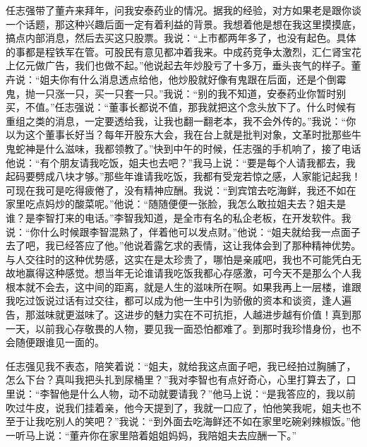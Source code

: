 \documentclass[12pt,oneside]{book}
\begin{document}
任志强带了董卉来拜年，问我安泰药业的情况。据我的经验，对方如果老是跟你谈一个话题，那这种兴趣后面一定有着利益的背景。我想着他是想在我这里摸摸底，搞点内部消息，然后去买这只股票。我说：``上市都两年多了，也没有起色。具体的事都是程铁军在管。可股民有意见都冲着我来。中成药竞争太激烈，汇仁肾宝花上亿元做广告，我们也做不起。''他说起去年炒股亏了十多万，垂头丧气的样子。董卉说：``姐夫你有什么消息透点给他，他炒股就好像有鬼跟在后面，还是个倒霉鬼，抛一只涨一只，买一只套一只。''我说：``别的我不知道，安泰药业你暂时别买，不值。''任志强说：``董事长都说不值，那我就把这个念头放下了。什么时候有重组之类的消息，一定要透给我，让我也翻一翻老本，我不会外传的。''我说：``你以为这个董事长好当？每年开股东大会，我在台上就是批判对象，文革时批那些牛鬼蛇神是什么滋味，我都领教了。''快到中午的时候，任志强的手机响了，接了电话他说：``有个朋友请我吃饭，姐夫也去吧？''我马上说：``要是每个人请我都去，我起码要劈成八块才够。''那些年谁请我吃饭，我都有受宠若惊之感，人家能记起我！可现在我可是吃得疲倦了，没有精神应酬。我说：``到宾馆去吃海鲜，我还不如在家里吃点妈炒的酸菜呢。''他说：``随随便便一张脸，我怎么敢拉姐夫去？姐夫是谁？是李智打来的电话。''李智我知道，是全市有名的私企老板，在开发软件。我说：``你什么时候跟李智混熟了，伴着他可以发点财。''他说：``姐夫就给我一点面子去了吧，我已经答应了他。''他说着露乞求的表情，这让我体会到了那种精神优势。与人交往时的这种优势感，这实在是太珍贵了，哪怕是亲戚吧，我也不可能凭白无故地赢得这种感觉。想当年无论谁请我吃饭我都心存感激，可今天不是那么个人我根本就不会去，这中间的距离，就是人生的滋味所在啊。如果我再上一层楼，谁跟我吃过饭说过话有过交往，都可以成为他一生中引为骄傲的资本和谈资，逢人遍告，那滋味就更滋味了。这进步的魅力实在不可抗拒，人越进步越有价值！真到那一天，以前我心存敬畏的人物，要见我一面恐怕都难了。到那时我珍惜身份，也不会随便跟谁见一面的。

任志强见我不表态，陪笑着说：``姐夫，就给我这点面子吧，我已经拍过胸脯了，怎么下台？真叫我把头扎到尿桶里？''我对李智也有点好奇心，心里打算去了，口里说：``李智他是什么人物，动不动就要请我？''他马上说：``是我答应的，我以前吹过牛皮，说我们挂着亲，他今天提到了，我就一口应了，怕他笑我呢，姐夫也不至于让我吃别人的笑吧？''我说：``到外面去吃海鲜还不如在家里吃碗剁辣椒饭。''他一听马上说：``董卉你在家里陪着姐姐妈妈，我陪姐夫去应酬一下。''
\end{document}

